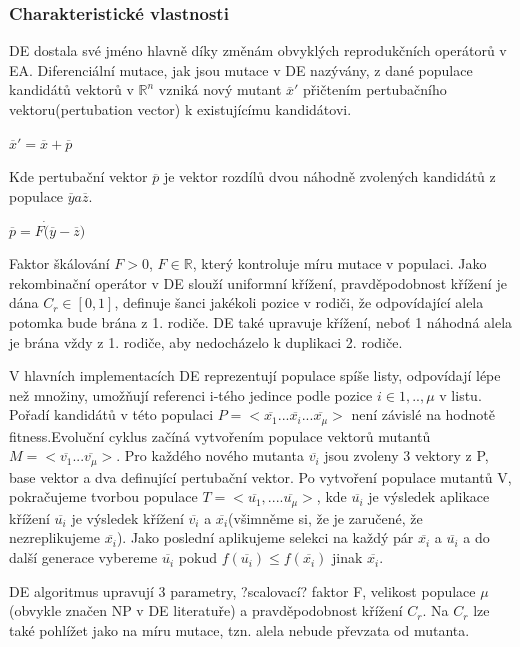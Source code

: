 \subsubsection{Charakteristické vlastnosti}
DE dostala své jméno hlavně díky změnám obvyklých reprodukčních operátorů v EA. Diferenciální mutace, jak jsou mutace v DE nazývány, z dané populace kandidátů vektorů v $\mathbb{R}^n$ vzniká nový mutant $\overline{x}'$ přičtením pertubačního vektoru(pertubation vector) k existujícímu kandidátovi. \par
$\overline{x}'=\overline{x}+\overline{p}$ \par
Kde pertubační vektor $\overline{p}$ je vektor rozdílů dvou náhodně zvolených kandidátů z populace $\overline{y} a \overline{z}$. \par 
$\overline{p}=F\dot(\overline{y}-\overline{z})$ \par
 Faktor škálování $F>0$, $F \in \mathbb{R}$, který kontroluje míru mutace v populaci. Jako rekombinační operátor v DE slouží uniformní křížení, pravděpodobnost křížení je dána $C_r \in [0,1]$, definuje šanci jakékoli pozice v rodiči, že odpovídající alela potomka bude brána z 1. rodiče. DE také upravuje křížení, neboť 1 náhodná alela je brána vždy z 1. rodiče, aby nedocházelo k duplikaci 2. rodiče. \par 
V hlavních implementacích DE reprezentují populace spíše listy, odpovídají lépe než množiny, umožňují referenci i-tého jedince podle pozice $i\in{1,..,\mu}$ v listu. Pořadí kandidátů v této populaci $P=<\overline{x_1}...\overline{x_i}...\overline{x_{\mu}}>$ není závislé na hodnotě fitness.Evoluční cyklus začíná vytvořením populace vektorů mutantů $M=<\overline{v_1}...\overline{v_{\mu}}>$. Pro každého nového mutanta $\overline{v_i}$ jsou zvoleny 3 vektory z P, base vektor a dva definující pertubační vektor. Po vytvoření populace mutantů V, pokračujeme tvorbou populace $T=<\overline{u_1},....\overline{u_{\mu}}>$, kde $\overline{u_i}$ je výsledek aplikace křížení $\overline{u_i}$ je výsledek křížení $\overline{v_i}$ a $\overline{x_i}$(všimněme si, že je zaručené, že nezreplikujeme $\overline{x_i}$). Jako poslední aplikujeme selekci na každý pár $\overline{x_i}$ a $\overline{u_i}$ a do další generace vybereme $\overline{u_i}$ pokud $f(\overline{u_i}) \leq f(\overline{x_i})$ jinak $\overline{x_i}$. \par 
DE algoritmus upravují 3 parametry, ?scalovací? faktor F, velikost populace $\mu$ (obvykle značen NP v DE literatuře) a pravděpodobnost křížení $C_r$. Na $C_r$ lze také pohlížet jako na míru mutace, tzn. alela nebude převzata od mutanta.\par

